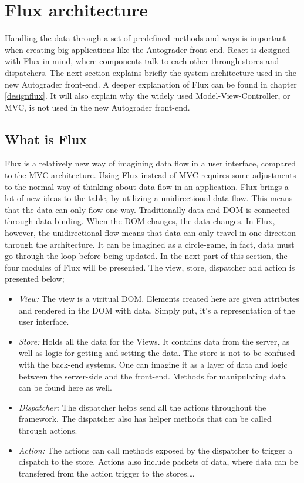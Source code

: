 \section{Flux architecture}

Handling the data through a set of predefined methods and ways is important when creating big applications like the Autograder front-end. React is designed with Flux in mind, where components talk to each other through stores and dispatchers. The next section explains briefly the system architecture used in the new Autograder front-end. A deeper explanation of Flux can be found in chapter \ref{designflux}. It will also explain why the widely used Model-View-Controller, or MVC, is not used in the new Autograder front-end.

  
\subsection{What is Flux}
Flux is a relatively new way of imagining data flow in a user interface, compared to the MVC architecture. Using Flux instead of MVC requires some adjustments to the normal way of thinking about data flow in an application. Flux brings a lot of new ideas to the table, by utilizing a unidirectional data-flow. This means that the data can only flow one way. Traditionally data and DOM is connected through data-binding. When the DOM changes, the data changes. In Flux, however, the unidirectional flow means that data can only travel in one direction through the architecture. It can be imagined as a circle-game, in fact, data must go through the loop before being updated. In the next part of this section, the four modules of Flux will be presented. The view, store, dispatcher and action is presented below;

\begin{itemize}  
\item \emph{View:} The view is a viritual DOM. Elements created here are given attributes and rendered in the DOM with data. Simply put, it's a representation of the user interface.
\item \emph{Store:} Holds all the data for the Views. It contains data from the server, as well as logic for getting and setting the data. The store is not to be confused with the back-end systems. One can imagine it as a layer of data and logic between the server-side and the front-end. Methods for manipulating data can be found here as well.
\item \emph{Dispatcher:} The dispatcher helps send all the actions throughout the framework. The dispatcher also has helper methods that can be called through actions.
\item \emph{Action:} The actions can call methods exposed by the dispatcher to trigger a dispatch to the store. Actions also include packets of data, where data can be transfered from the action trigger to the stores.\ldots 
\end{itemize}

